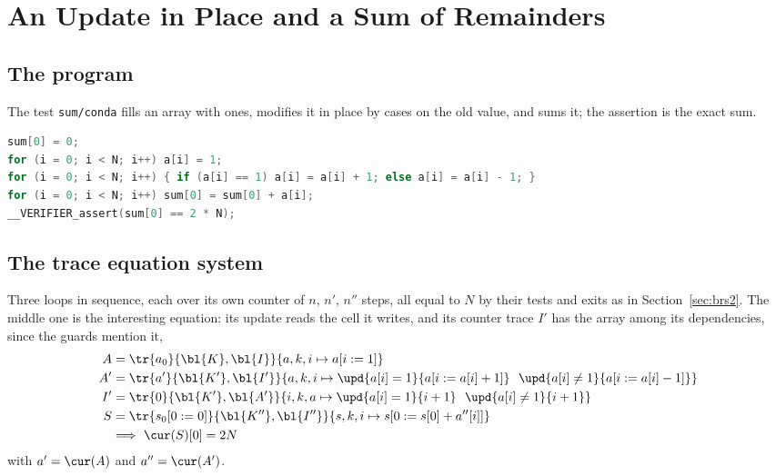 \section{An Update in Place and a Sum of Remainders}\label{sec:conda}

\subsection{The program}
The test \texttt{sum/conda} fills an array with ones, modifies it in place by cases on the old value, and
sums it; the assertion is the exact sum.
\begin{lstlisting}[language=C]
sum[0] = 0;
for (i = 0; i < N; i++) a[i] = 1;
for (i = 0; i < N; i++) { if (a[i] == 1) a[i] = a[i] + 1; else a[i] = a[i] - 1; }
for (i = 0; i < N; i++) sum[0] = sum[0] + a[i];
__VERIFIER_assert(sum[0] == 2 * N);
\end{lstlisting}

\subsection{The trace equation system}
Three loops in sequence, each over its own counter of $n$, $n'$, $n''$ steps, all equal to $N$ by their
tests and exits as in Section~\ref{sec:brs2}. The middle one is the interesting equation: its update reads
the cell it writes, and its counter trace $I'$ has the array among its dependencies, since the guards
mention it,
\begin{align}
  A &= \tr{a_0}{\bl{K}, \bl{I}}{a, k, i \mapsto a[i := 1]} \label{eq:cd1}\\
  A' &= \tr{a'}{\bl{K'}, \bl{I'}}{a, k, i \mapsto \upd{a[i] = 1}{a[i := a[i] + 1]}\ \ \upd{a[i] \ne 1}{a[i := a[i] - 1]}} \label{eq:cd2}\\
  I' &= \tr{0}{\bl{K'}, \bl{A'}}{i, k, a \mapsto \upd{a[i] = 1}{i + 1}\ \ \upd{a[i] \ne 1}{i + 1}} \nonumber\\
  S &= \tr{s_0[0 := 0]}{\bl{K''}, \bl{I''}}{s, k, i \mapsto s[0 := s[0] + a''[i]]} \label{eq:cd3}\\
  &\Longrightarrow\ \cur(S)[0] = 2N \nonumber
\end{align}
with $a' = \cur(A)$ and $a'' = \cur(A')$.

